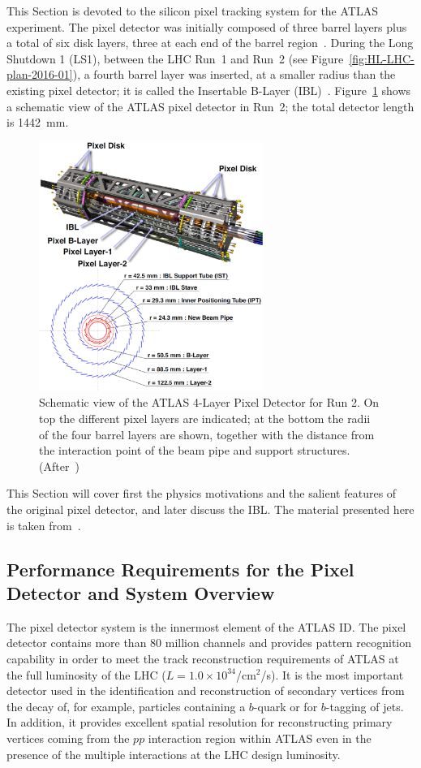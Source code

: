 This Section is devoted to the silicon pixel tracking system for the ATLAS experiment. 
The pixel detector was initially composed of three barrel layers plus  a total of six disk layers, three at 
each end of the barrel region~\cite{AtlasPixels}. During the Long Shutdown 1 (LS1), between 
the LHC Run~1 and Run~2 (see Figure~\ref{fig:HL-LHC-plan-2016-01}), a fourth barrel layer was inserted, at a smaller radius than the existing 
pixel detector; it is called the Insertable B-Layer (IBL)~\cite{IBLTDR}.
Figure~\ref{fig:ATLASPixels} shows a schematic view of the ATLAS pixel detector in Run~2; the total 
detector length is 1442~mm. 
\begin{figure}[!htbp]
\centering
\includegraphics[width=0.65\textwidth]{ATLASPixels.jpg}
\caption{\label{fig:ATLASPixels}Schematic view of the ATLAS 4-Layer Pixel Detector for Run 2. 
On top the different pixel layers are indicated; at the bottom the radii of the four barrel layers are shown, together with the distance from the interaction point of the beam pipe and support structures. (After~\cite{BACKHAUS201665})}
\end{figure}

This Section will cover first the physics motivations and the salient features of the original pixel detector, and later discuss the IBL. The material presented here is taken from~\cite{AtlasPixels,IBLTDR}.

\subsection{Performance Requirements for the Pixel Detector and System Overview}
\label{sec:pixeloverview}
The pixel detector system is the innermost element of the ATLAS ID. The pixel detector contains 
more than 80 million channels and provides pattern recognition capability in order to meet the track 
reconstruction requirements of ATLAS at the full luminosity of the LHC ($L=1.0\times10^{34}$/cm$^{2}$/s). It is the most important detector used in the identification and reconstruction of secondary vertices from the decay of, for example, particles containing a $b$-quark or for $b$-tagging of jets. In addition, it provides excellent spatial resolution for reconstructing primary vertices coming from the $pp$ interaction region within ATLAS even in the presence of the multiple interactions at the LHC design luminosity. 

